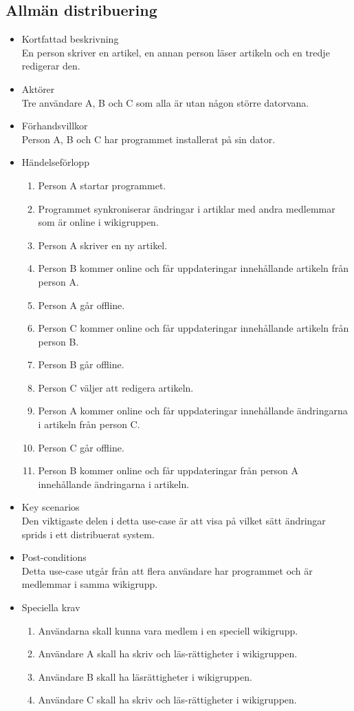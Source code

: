 \subsection{Allmän distribuering}
\begin{itemize}
	\item Kortfattad beskrivning
	\\En person skriver en artikel, en annan person läser artikeln och en tredje redigerar den.
	\item Aktörer
	\\Tre användare A, B och C som alla är utan någon större datorvana.
	\item Förhandsvillkor
	\\Person A, B och C har programmet installerat på sin dator.
	\item  Händelseförlopp
	\begin{enumerate}
		\item Person A startar programmet.
		\item Programmet synkroniserar ändringar i artiklar med andra medlemmar som är online i wikigruppen.
		\item Person A skriver en ny artikel.
		\item Person B kommer online och får uppdateringar innehållande artikeln från person A.
		\item Person A går offline.
		\item Person C kommer online och får uppdateringar innehållande artikeln från person B.
		\item Person B går offline.
		\item Person C väljer att redigera artikeln.
		\item Person A kommer online och får uppdateringar innehållande ändringarna i artikeln från person C.
		\item Person C går offline.
		\item Person B kommer online och får uppdateringar från person A innehållande ändringarna i artikeln.
	\end{enumerate}	
	\item Key scenarios
	\\Den viktigaste delen i detta use-case är att visa på vilket sätt ändringar sprids i ett distribuerat system.
	\item Post-conditions
	\\Detta use-case utgår från att flera användare har programmet och är medlemmar i samma wikigrupp.
	\item Speciella krav
	\begin{enumerate}	
		\item Användarna skall kunna vara medlem i en speciell wikigrupp.
		\item Användare A skall ha skriv och läs-rättigheter i wikigruppen.
		\item Användare B skall ha läsrättigheter i wikigruppen.
		\item Användare C skall ha skriv och läs-rättigheter i wikigruppen.
	\end{enumerate}
\end{itemize}


